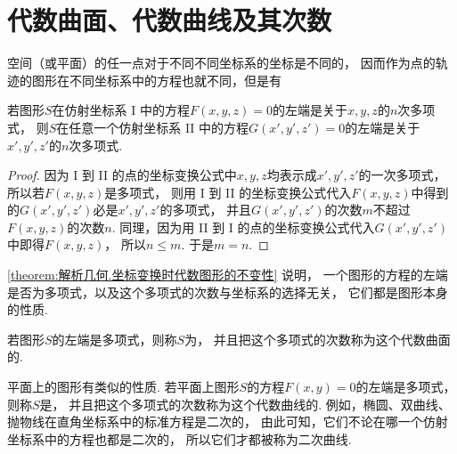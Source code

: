\section{代数曲面、代数曲线及其次数}
空间（或平面）的任一点对于不同不同坐标系的坐标是不同的，
因而作为点的轨迹的图形在不同坐标系中的方程也就不同，但是有
\begin{theorem}\label{theorem:解析几何.坐标变换时代数图形的不变性}
若图形\(S\)在仿射坐标系 I 中的方程\(F(x,y,z)=0\)的左端是关于\(x,y,z\)的\(n\)次多项式，
则\(S\)在任意一个仿射坐标系 II 中的方程\(G(x',y',z')=0\)的左端是关于\(x',y',z'\)的\(n\)次多项式.
\begin{proof}
因为 I 到 II 的点的坐标变换公式中\(x,y,z\)均表示成\(x',y',z'\)的一次多项式，
所以若\(F(x,y,z)\)是多项式，
则用 I 到 II 的坐标变换公式代入\(F(x,y,z)\)中得到的\(G(x',y',z')\)必是\(x',y',z'\)的多项式，
并且\(G(x',y',z')\)的次数\(m\)不超过\(F(x,y,z)\)的次数\(n\).
同理，因为用 II 到 I 的点的坐标变换公式代入\(G(x',y',z')\)中即得\(F(x,y,z)\)，
所以\(n \leq m\).
于是\(m = n\).
\end{proof}
\end{theorem}
\cref{theorem:解析几何.坐标变换时代数图形的不变性} 说明，
一个图形的方程的左端是否为多项式，以及这个多项式的次数与坐标系的选择无关，
它们都是图形本身的性质.

若图形\(S\)的左端是多项式，则称\(S\)为，
并且把这个多项式的次数称为这个代数曲面的.

平面上的图形有类似的性质.
若平面上图形\(S\)的方程\(F(x,y)=0\)的左端是多项式，
则称\(S\)是，
并且把这个多项式的次数称为这个代数曲线的.
例如，椭圆、双曲线、抛物线在直角坐标系中的标准方程是二次的，
由此可知，它们不论在哪一个仿射坐标系中的方程也都是二次的，
所以它们才都被称为二次曲线.

